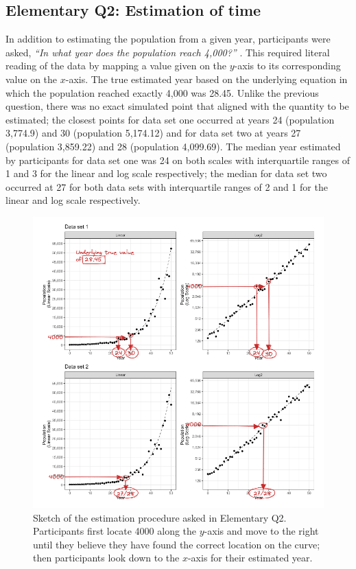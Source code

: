 \documentclass[print]{nuthesis}
\begin{document}
\hypertarget{elementary-q2-estimation-of-time}{%
\subsection{Elementary Q2: Estimation of time}\label{elementary-q2-estimation-of-time}}

In addition to estimating the population from a given year, participants were asked, \emph{``In what year does the population reach 4,000?''} .
This required literal reading of the data by mapping a value given on the \(y\)-axis to its corresponding value on the \(x\)-axis.
The true estimated year based on the underlying equation in which the population reached exactly 4,000 was 28.45.
Unlike the previous question, there was no exact simulated point that aligned with the quantity to be estimated; the closest points for data set one occurred at years 24 (population 3,774.9) and 30 (population 5,174.12) and for data set two at years 27 (population 3,859.22) and 28 (population 4,099.69).
The median year estimated by participants for data set one was 24 on both scales with interquartile ranges of 1 and 3 for the linear and log scale respectively; the median for data set two occurred at 27 for both data sets with interquartile ranges of 2 and 1 for the linear and log scale respectively.

\begin{figure}[tbp]

{\centering \includegraphics[width=1\linewidth,]{images/03-estimation/qe2-sketch} 

}

\caption[Elementary Q2 sketch]{Sketch of the estimation procedure asked in Elementary Q2. Participants first locate 4000 along the $y$-axis and move to the right until they believe they have found the correct location on the curve; then participants look down to the $x$-axis for their estimated year.}\label{fig:qe2-sketch}
\end{figure}
\end{document}
